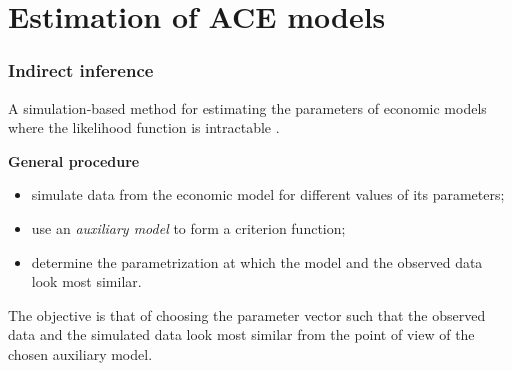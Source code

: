 \documentclass[10pt]{beamer}
\begin{document}
\section{Estimation of ACE models}
\label{sec:estimation_general}




\begin{frame}[c]\frametitle{Indirect inference}
	A simulation-based method for estimating the parameters of economic models where the likelihood function is intractable \citep{gourieroux1993indirect}. \bigskip 

	\alert{\textbf{General procedure}}
	\begin{itemize}
		\item simulate data from the economic model for different values of its parameters;
		\item use an \emph{auxiliary model} to form a criterion function;
		\item determine the parametrization at which the model and the observed data look most similar.
	\end{itemize} \bigskip
	
	The objective is that of choosing the parameter vector such that the observed data and the simulated data look most similar from the point of view of the chosen auxiliary model.
\end{frame}
\end{document}
